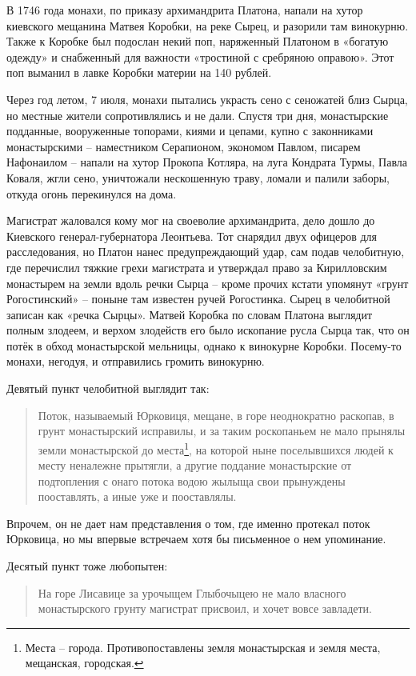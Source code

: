 В 1746 года монахи, по приказу архимандрита Платона, напали на хутор киевского мещанина Матвея Коробки, на реке Сырец, и разорили там винокурню. Также к Коробке был подослан некий поп, наряженный Платоном в «богатую одежду» и снабженный для важности «тростиной с сребряною оправою». Этот поп выманил в лавке Коробки материи на 140 рублей.

Через год летом, 7 июля, монахи пытались украсть сено с сеножатей близ Сырца, но местные жители сопротивлялись и не дали. Спустя три дня, монастырские подданные, вооруженные топорами, киями и цепами, купно с законниками монастырскими – наместником Серапионом, экономом Павлом, писарем Нафонаилом – напали на хутор Прокопа Котляра, на луга Кондрата Турмы, Павла Коваля, жгли сено, уничтожали нескошенную траву, ломали и палили заборы, откуда огонь перекинулся на дома.
 
Магистрат жаловался кому мог на своеволие архимандрита, дело дошло до Киевского генерал-губернатора Леонтьева. Тот снарядил двух офицеров для расследования, но Платон нанес предупреждающий удар, сам подав челобитную, где перечислил тяжкие грехи магистрата и утверждал право за Кирилловским монастырем на земли вдоль речки Сырца – кроме прочих кстати упомянут «грунт Рогостинский» – поныне там известен ручей Рогостинка. Сырец в челобитной записан как «речка Сырцы». Матвей Коробка по словам Платона выглядит полным злодеем, и верхом злодейств его было ископание русла Сырца так, что он потёк в обход монастырской мельницы, однако к винокурне Коробки. Посему-то монахи, негодуя, и отправились громить винокурню. 

Девятый пункт челобитной выглядит так:

\begin{quotation}
Поток, называемый Юрковиця, мещане, в горе неоднократно раскопав, в грунт монастырский исправилы, и за таким роскопаньем не мало прынялы земли монастырской до места\footnote{Места – города. Противопоставлены земля монастырская и земля места, мещанская, городская.}, на которой ныне поселывшихся людей к месту неналежне прытягли, а другие поддание монастырские от подтопления с онаго потока водою жылыща свои прынуждены пооставлять, а иные уже и пооставлялы.
\end{quotation}

Впрочем, он не дает нам представления о том, где именно протекал поток Юрковица, но мы впервые встречаем хотя бы письменное о нем упоминание.

Десятый пункт тоже любопытен:

\begin{quotation}
На горе Лисавице за урочыщем Глыбочыцею не мало власного монастырского грунту магистрат присвоил, и хочет вовсе завладети.
\end{quotation}

